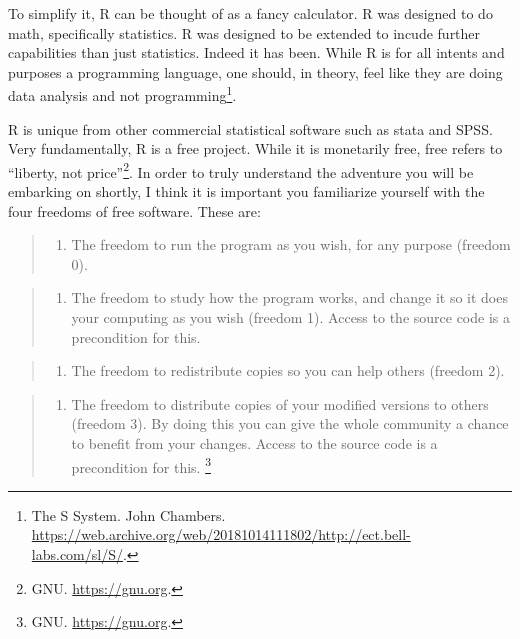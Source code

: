 \documentclass[
]{book}
\providecommand{\tightlist}{%
  \setlength{\itemsep}{0pt}\setlength{\parskip}{0pt}}
\begin{document}
To simplify it, R can be thought of as a fancy calculator. R was designed to do math, specifically statistics. R was designed to be extended to incude further capabilities than just statistics. Indeed it has been. While R is for all intents and purposes a programming language, one should, in theory, feel like they are doing data analysis and not programming\footnote{The S System. John Chambers. \url{https://web.archive.org/web/20181014111802/http://ect.bell-labs.com/sl/S/}.}.

R is unique from other commercial statistical software such as stata and SPSS. Very fundamentally, R is a free project. While it is monetarily free, free refers to ``liberty, not price''\footnote{GNU. \url{https://gnu.org}.}. In order to truly understand the adventure you will be embarking on shortly, I think it is important you familiarize yourself with the four freedoms of free software. These are:

\begin{quote}
\begin{enumerate}
\def\labelenumi{\arabic{enumi}.}
\tightlist
\item
  The freedom to run the program as you wish, for any purpose (freedom 0).
\end{enumerate}
\end{quote}

\begin{quote}
\begin{enumerate}
\def\labelenumi{\arabic{enumi}.}
\setcounter{enumi}{1}
\tightlist
\item
  The freedom to study how the program works, and change it so it does your computing as you wish (freedom 1). Access to the source code is a precondition for this.
\end{enumerate}
\end{quote}

\begin{quote}
\begin{enumerate}
\def\labelenumi{\arabic{enumi}.}
\setcounter{enumi}{2}
\tightlist
\item
  The freedom to redistribute copies so you can help others (freedom 2).
\end{enumerate}
\end{quote}

\begin{quote}
\begin{enumerate}
\def\labelenumi{\arabic{enumi}.}
\setcounter{enumi}{3}
\tightlist
\item
  The freedom to distribute copies of your modified versions to others (freedom 3). By doing this you can give the whole community a chance to benefit from your changes. Access to the source code is a precondition for this. \footnote{GNU. \url{https://gnu.org}.}
\end{enumerate}
\end{quote}
\end{document}
